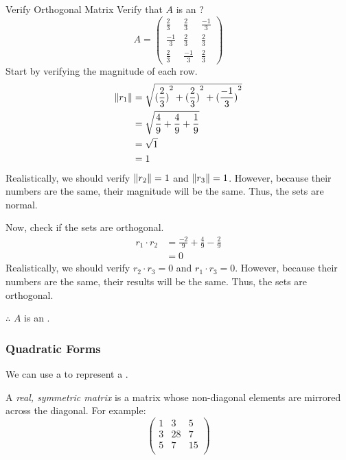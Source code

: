 \begin{example}{Verify Orthogonal Matrix}
  Verify that $A$ is an ?
  \begin{equation*}
    A =
    \begin{pmatrix}
      \frac{2}{3} & \frac{2}{3} & \frac{-1}{3} \\
      \frac{-1}{3} & \frac{2}{3} & \frac{2}{3} \\
      \frac{2}{3} & \frac{-1}{3} & \frac{2}{3}
    \end{pmatrix}
  \end{equation*}
  \tcblower{}
  Start by verifying the magnitude of each row.
  \begin{align*}
    \lVert r_{1} \rVert &= \sqrt{{(\frac{2}{3})}^{2} + {(\frac{2}{3})}^{2} + {(\frac{-1}{3})}^{2}} \\
                      &= \sqrt{\frac{4}{9} + \frac{4}{9} + \frac{1}{9}} \\
                      &= \sqrt{1} \\
                      &= 1
  \end{align*}
  Realistically, we should verify $\lVert r_{2} \rVert = 1$ and $\lVert r_{3} \rVert = 1$.
  However, because their numbers are the same, their magnitude will be the same.
  Thus, the sets are normal.

  Now, check if the sets are orthogonal.
  \begin{align*}
    r_{1} \cdot r_{2} &= \frac{-2}{9} + \frac{4}{9} - \frac{2}{9} \\
                     &= 0
  \end{align*}
  Realistically, we should verify $r_{2} \cdot r_{3} = 0$ and $r_{1} \cdot r_{3} = 0$.
  However, because their numbers are the same, their results will be the same.
  Thus, the sets are orthogonal.

  $\therefore$ $A$ is an .
\end{example}

\subsubsection{Quadratic Forms}\label{subsubsec:Quadratic_Forms}
We can use a  to represent a .

\begin{definition}\label{def:Real_Symmetric_Matrix}
  A \emph{real, symmetric matrix} is a matrix whose non-diagonal elements are mirrored across the diagonal.
  For example:
  \begin{equation*}
    \begin{pmatrix}
      1 & 3 & 5 \\
      3 & 28 & 7 \\
      5 & 7 & 15 \\
    \end{pmatrix}
  \end{equation*}
\end{definition}


